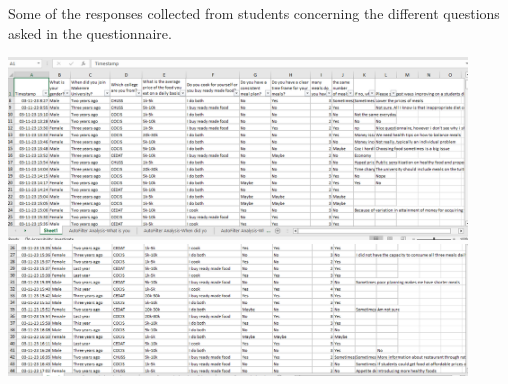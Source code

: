 \documentclass{article}
\begin{document}
Some of the responses collected from students concerning the different questions asked in the questionnaire.

\vspace{30pt}
\begin{center}

\includegraphics[width=460px]{images/data.PNG}\\
\vspace{30pt}
\includegraphics[width=460px]{images/data2.PNG}

\end{center}
\end{document}

